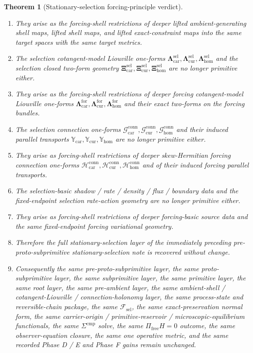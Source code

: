 \documentclass[11pt]{article}
\newcommand{\StemFunctional}{\mathscr F_{\mathrm{sel}}}
\newcommand{\Car}{\mathrm{car}}
\newcommand{\Cur}{\mathrm{cur}}
\newcommand{\Hom}{\mathrm{hom}}
\newcommand{\SelLiouville}[1]{\boldsymbol{\Lambda}_{#1}^{\mathrm{sel}}}
\newcommand{\SelTwo}[1]{\boldsymbol{\Xi}_{#1}^{\mathrm{sel}}}
\newcommand{\SelConnectionForm}[1]{\mathcal G_{#1}^{\mathrm{conn}}}
\newcommand{\SelTransport}[1]{\mathbb Y_{#1}}
\newcommand{\ForLiouville}[1]{\boldsymbol{\Lambda}_{#1}^{\mathrm{for}}}
\newcommand{\ForConnectionForm}[1]{\mathcal H_{#1}^{\mathrm{conn}}}
\newtheorem{theorem}{Theorem}
\begin{document}
\begin{theorem}[Stationary-selection forcing-principle verdict]
\begin{enumerate}
    \item They arise as the forcing-shell restrictions of deeper lifted ambient-generating shell maps, lifted shell maps, and lifted exact-constraint maps into the same target spaces with the same target metrics.
    \item The selection cotangent-model Liouville one-forms \(\SelLiouville{\Car},\SelLiouville{\Cur},\SelLiouville{\Hom}\) and the selection closed two-form geometry \(\SelTwo{\Car},\SelTwo{\Cur},\SelTwo{\Hom}\) are no longer primitive either.
    \item They arise as the forcing-shell restrictions of deeper forcing cotangent-model Liouville one-forms \(\ForLiouville{\Car},\ForLiouville{\Cur},\ForLiouville{\Hom}\) and their exact two-forms on the forcing bundles.
    \item The selection connection one-forms \(\SelConnectionForm{\Car},\SelConnectionForm{\Cur},\SelConnectionForm{\Hom}\) and their induced parallel transports \(\SelTransport{\Car},\SelTransport{\Cur},\SelTransport{\Hom}\) are no longer primitive either.
    \item They arise as forcing-shell restrictions of deeper skew-Hermitian forcing connection one-forms \(\ForConnectionForm{\Car},\ForConnectionForm{\Cur},\ForConnectionForm{\Hom}\) and of their induced forcing parallel transports.
    \item The selection-basic shadow / rate / density / flux / boundary data and the fixed-endpoint selection rate-action geometry are no longer primitive either.
    \item They arise as forcing-shell restrictions of deeper forcing-basic source data and the same fixed-endpoint forcing variational geometry.
    \item Therefore the full stationary-selection layer of the immediately preceding pre-proto-subprimitive stationary-selection note is recovered without change.
    \item Consequently the same pre-proto-subprimitive layer, the same proto-subprimitive layer, the same subprimitive layer, the same primitive layer, the same root layer, the same pre-ambient layer, the same ambient-shell / cotangent-Liouville / connection-holonomy layer, the same process-state and reversible-chain package, the same \(\StemFunctional\), the same exact-preservation normal form, the same carrier-origin / primitive-reservoir / microscopic-equilibrium functionals, the same \(\Sigma^{\mathrm{cmp}}\) solve, the same \(\Pi_{\mathrm{free}}H=0\) outcome, the same observer-equation closure, the same one operative metric, and the same recorded Phase D / E and Phase F gains remain unchanged.

\end{enumerate}
\end{theorem}
\end{document}
